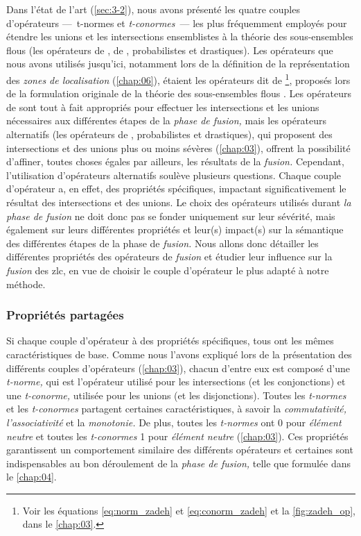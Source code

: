 Dans l'état de l'art (\autoref{sec:3-2}), nous avons présenté les
quatre couples d'opérateurs ---~t-normes et \emph{t-conormes}~--- les
plus fréquemment employés pour étendre les unions et les intersections
ensemblistes à la théorie des sous-ensembles flous (\ie les opérateurs
de \textcite{Zadeh1965}, de , probabilistes et
drastiques). Les opérateurs que nous avons utilisés jusqu'ici,
notamment lors de la définition de la représentation des \emph{zones
  de localisation} (\autoref{chap:06}), étaient les opérateurs dit de
 \footnote{Voir les équations \ref{eq:norm_zadeh} et
  \ref{eq:conorm_zadeh} et la \autoref{fig:zadeh_op}, dans le
  \autoref{chap:03}.}, proposés lors de la formulation originale de la
théorie des sous-ensembles flous \autocite{Zadeh1965}. Les opérateurs
de  sont tout à fait appropriés pour effectuer les
intersections et les unions nécessaires aux différentes étapes de la
\emph{phase de fusion,} mais les opérateurs alternatifs (\ie les
opérateurs de , probabilistes et drastiques), qui
proposent des intersections et des unions plus ou moins sévères
(\autoref{chap:03}), offrent la possibilité d'affiner, toutes choses
égales par ailleurs, les résultats de la \emph{fusion.} Cependant,
l'utilisation d'opérateurs alternatifs soulève plusieurs
questions. Chaque couple d'opérateur a, en effet, des propriétés
spécifiques, impactant significativement le résultat des intersections
et des unions. Le choix des opérateurs utilisés durant \emph{la phase
  de fusion} ne doit donc pas se fonder uniquement sur leur sévérité,
mais également sur leurs différentes propriétés et leur(s) impact(s)
sur la sémantique des différentes étapes de la phase de \emph{fusion.}
Nous allons donc détailler les différentes propriétés des opérateurs
de \emph{fusion} et étudier leur influence sur la \emph{fusion} des
\ac{zlc}, en vue de choisir le couple d'opérateur le plus adapté à
notre méthode.

\subsubsection{Propriétés partagées}

Si chaque couple d'opérateur à des propriétés spécifiques, tous ont
les mêmes caractéristiques de base. Comme nous l'avons expliqué lors
de la présentation des différents couples d'opérateurs
(\autoref{chap:03}), chacun d'entre eux est composé d'une
\emph{t-norme,} qui est l'opérateur utilisé pour les intersections (et
les conjonctions) et une \emph{t-conorme,} utilisée pour les unions
(et les disjonctions). Toutes les \emph{t-normes} et les
\emph{t-conormes} partagent certaines caractéristiques, à savoir la
\emph{commutativité,} \emph{l'associativité} et la \emph{monotonie.}
De plus, toutes les \emph{t-normes} ont 0 pour \emph{élément neutre}
et toutes les \emph{t-conormes} 1 pour \emph{élément neutre}
(\autoref{chap:03}). Ces propriétés garantissent un comportement
similaire des différents opérateurs et certaines sont indispensables
au bon déroulement de la \emph{phase de fusion,} telle que formulée
dans le \autoref{chap:04}.

